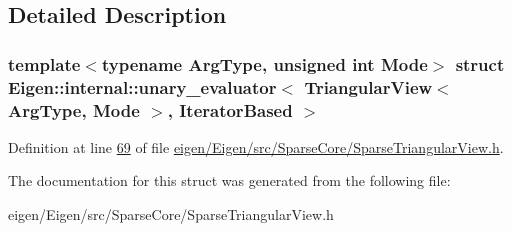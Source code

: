 \subsection{Detailed Description}
\subsubsection*{template$<$typename Arg\+Type, unsigned int Mode$>$\newline
struct Eigen\+::internal\+::unary\+\_\+evaluator$<$ Triangular\+View$<$ Arg\+Type, Mode $>$, Iterator\+Based $>$}



Definition at line \hyperlink{eigen_2_eigen_2src_2_sparse_core_2_sparse_triangular_view_8h_source_l00069}{69} of file \hyperlink{eigen_2_eigen_2src_2_sparse_core_2_sparse_triangular_view_8h_source}{eigen/\+Eigen/src/\+Sparse\+Core/\+Sparse\+Triangular\+View.\+h}.



The documentation for this struct was generated from the following file\+:\begin{DoxyCompactItemize}
\item 
eigen/\+Eigen/src/\+Sparse\+Core/\+Sparse\+Triangular\+View.\+h\end{DoxyCompactItemize}
